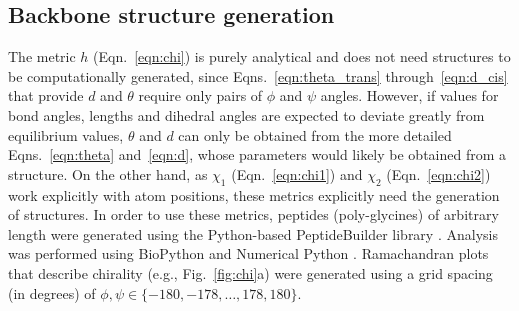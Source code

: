 \documentclass[fleqn,10pt,lineno]{wlpeerj} %
\newcommand{\n}[1]{{\color{blue}#1}}
\newcommand{\Fig}[1]{Fig.~\ref{#1}}
\newcommand{\Eqn}[1]{Eqn.~\ref{#1}}
\newcommand{\Eqns}[1]{Eqns.~\ref{#1}}
\newcommand{\h}{h}
\begin{document}
\subsection*{\n{Backbone structure generation}}
\n{The metric $\h$ (\Eqn{eqn:chi})} is purely analytical and does not need structures to be computationally generated\n{, since \Eqns{eqn:theta_trans} through~\ref{eqn:d_cis} that provide $d$ and $\theta$ require only pairs of $\phi$ and $\psi$ angles. However, if values for bond angles, lengths and dihedral angles are expected to deviate greatly from equilibrium values, $\theta$ and $d$ can only be obtained from the more detailed \Eqns{eqn:theta} and~\ref{eqn:d}, whose parameters would likely be obtained from a structure. On the other hand, as $\chi_1$ (\Eqn{eqn:chi1}) and $\chi_2$ (\Eqn{eqn:chi2}) work explicitly with atom positions, these metrics explicitly need the generation of structures.} In order to use these metrics, peptides (poly-glycines) of arbitrary length were generated using the Python-based PeptideBuilder library \citep{Tien2013}. 
Analysis was performed using BioPython \citep{Cock2009} and Numerical Python \citep{VanDerWalt2011}. Ramachandran plots that describe chirality (e.g., \Fig{fig:chi}a) were generated using a grid spacing (in degrees) of $\phi,\psi \in \{-180,-178,\ldots,178,180\}$.
\end{document}
